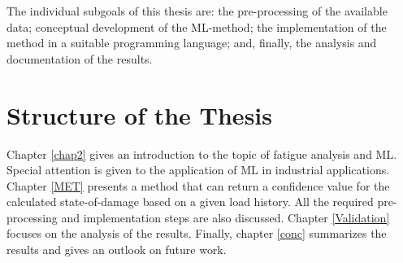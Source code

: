 The individual subgoals of this thesis are: the pre-processing of the available data; conceptual development of the ML-method; the implementation of the method in a suitable programming language; and, finally, the analysis and documentation of the results.

\section{Structure of the Thesis}
Chapter \ref{chap2} gives an introduction to the topic of fatigue analysis and ML. Special attention is given to the application of ML in industrial applications. Chapter \ref{MET} presents a method that can return a confidence value for the calculated state-of-damage based on a given load history. All the required pre-processing and implementation steps are also discussed. Chapter \ref{Validation} focuses on the analysis of the results. Finally, chapter \ref{conc} summarizes the results and gives an outlook on future work.
